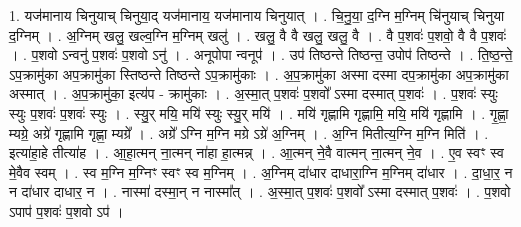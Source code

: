 \documentclass[17pt]{extarticle}
\begin{document}
1. यज॑मानाय चिनुयाच् चिनुया॒द् यज॑मानाय॒ यज॑मानाय चिनुयात् । . चि॒नु॒या॒ द॒ग्नि म॒ग्निम् चि॑नुयाच् चिनुया द॒ग्निम् । . अ॒ग्निम् खलु॒ खल्व॒ग्नि म॒ग्निम् खलु॑ । . खलु॒ वै वै खलु॒ खलु॒ वै । . वै प॒शवः॑ प॒शवो॒ वै वै प॒शवः॑ । . प॒शवो ऽन्वनु॑ प॒शवः॑ प॒शवो ऽनु॑ । . अनूपोपा न्वनूप॑ । . उप॑ तिष्ठन्ते तिष्ठन्त॒ उपोप॑ तिष्ठन्ते । . ति॒ष्ठ॒न्ते॒ ऽप॒क्रामु॑का अप॒क्रामु॑का स्तिष्ठन्ते तिष्ठन्ते ऽप॒क्रामु॑काः । . अ॒प॒क्रामु॑का अस्मा दस्मा दप॒क्रामु॑का अप॒क्रामु॑का अस्मात् । . अ॒प॒क्रामु॑का॒ इत्य॑प - क्रामु॑काः । . अ॒स्मा॒त् प॒शवः॑ प॒शवो᳚ ऽस्मा दस्मात् प॒शवः॑ । . प॒शवः॑ स्युः स्युः प॒शवः॑ प॒शवः॑ स्युः । . स्यु॒र् मयि॒ मयि॑ स्युः स्यु॒र् मयि॑ । . मयि॑ गृह्णामि गृह्णामि॒ मयि॒ मयि॑ गृह्णामि । . गृ॒ह्णा॒ म्यग्रे॒ अग्रे॑ गृह्णामि गृह्णा॒ म्यग्रे᳚ । . अग्रे᳚ ऽग्नि म॒ग्नि मग्रे ऽग्रे॑ अ॒ग्निम् । . अ॒ग्नि मितीत्य॒ग्नि म॒ग्नि मिति॑ । . इत्या॑हा॒हे तीत्या॑ह । . आ॒हा॒त्मन् ना॒त्मन् ना॑हा हा॒त्मन्न् । . आ॒त्मन् ने॒वै वात्मन् ना॒त्मन् ने॒व । . ए॒व स्वꣳ स्व मे॒वैव स्वम् । . स्व म॒ग्नि म॒ग्निꣳ स्वꣳ स्व म॒ग्निम् । . अ॒ग्निम् दा॑धार दाधारा॒ग्नि म॒ग्निम् दा॑धार । . दा॒धा॒र॒ न न दा॑धार दाधार॒ न । . नास्मा॑ दस्मा॒न् न नास्मा᳚त् । . अ॒स्मा॒त् प॒शवः॑ प॒शवो᳚ ऽस्मा दस्मात् प॒शवः॑ । . प॒शवो ऽपाप॑ प॒शवः॑ प॒शवो ऽप॑ । \newline
\end{document}
